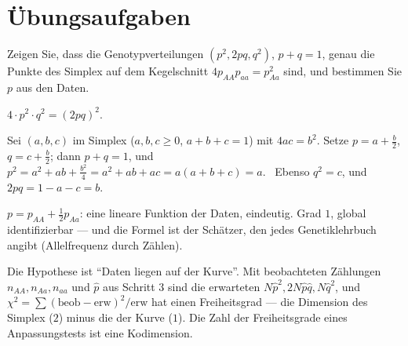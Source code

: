 \section{Übungsaufgaben}

\begin{aufgabe}
Zeigen Sie, dass die Genotypverteilungen $(p^{2}, 2pq, q^{2})$, $p + q = 1$, genau die Punkte des Simplex auf dem Kegelschnitt $4p_{AA}p_{aa} = p_{Aa}^{2}$ sind, und bestimmen Sie $p$ aus den Daten.

\loesung
{}
$4\cdot p^{2}\cdot q^{2} = (2pq)^{2}$. \checkmark

Sei $(a, b, c)$ im Simplex ($a, b, c\ge0$, $a + b + c = 1$) mit $4ac = b^{2}$. Setze $p = a + \tfrac b2$, $q = c + \tfrac b2$; dann $p + q = 1$, und $p^{2} = a^{2} + ab + \tfrac{b^{2}}{4} = a^{2} + ab + ac = a(a + b + c) = a$. \checkmark\ Ebenso $q^{2} = c$, und $2pq = 1 - a - c = b$. \checkmark

$p = p_{AA} + \tfrac12p_{Aa}$: eine lineare Funktion der Daten, eindeutig. Grad $1$, global identifizierbar --- und die Formel ist der Schätzer, den jedes Genetiklehrbuch angibt (Allelfrequenz durch Zählen).

Die Hypothese ist \enquote{Daten liegen auf der Kurve}. Mit beobachteten Zählungen $n_{AA}, n_{Aa}, n_{aa}$ und $\hat p$ aus Schritt 3 sind die erwarteten $N\hat p^{2}, 2N\hat p\hat q, N\hat q^{2}$, und $\chi^{2} = \sum(\text{beob} - \text{erw})^{2}/\text{erw}$ hat einen Freiheitsgrad --- die Dimension des Simplex ($2$) minus die der Kurve ($1$). Die Zahl der Freiheitsgrade eines Anpassungstests ist eine Kodimension.

\begin{center}
\begin{minipage}{0.88\textwidth}
\end{minipage}
\end{center}
\end{aufgabe}

